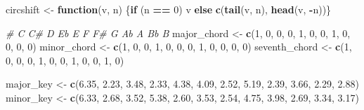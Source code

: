 \documentclass[]{article}
\newenvironment{Shaded}{\begin{snugshade}}{\end{snugshade}}
\newcommand{\CommentTok}[1]{\textcolor[rgb]{0.56,0.35,0.01}{\textit{#1}}}
\newcommand{\ControlFlowTok}[1]{\textcolor[rgb]{0.13,0.29,0.53}{\textbf{#1}}}
\newcommand{\DecValTok}[1]{\textcolor[rgb]{0.00,0.00,0.81}{#1}}
\newcommand{\FloatTok}[1]{\textcolor[rgb]{0.00,0.00,0.81}{#1}}
\newcommand{\KeywordTok}[1]{\textcolor[rgb]{0.13,0.29,0.53}{\textbf{#1}}}
\newcommand{\NormalTok}[1]{#1}
\newcommand{\OperatorTok}[1]{\textcolor[rgb]{0.81,0.36,0.00}{\textbf{#1}}}
\newcommand{\StringTok}[1]{\textcolor[rgb]{0.31,0.60,0.02}{#1}}
\begin{document}
\begin{Shaded}
\begin{Highlighting}[]
\NormalTok{circshift <-}\StringTok{ }\ControlFlowTok{function}\NormalTok{(v, n) \{}\ControlFlowTok{if}\NormalTok{ (n }\OperatorTok{==}\StringTok{ }\DecValTok{0}\NormalTok{) v }\ControlFlowTok{else} \KeywordTok{c}\NormalTok{(}\KeywordTok{tail}\NormalTok{(v, n), }\KeywordTok{head}\NormalTok{(v, }\OperatorTok{-}\NormalTok{n))\}}
                                    
    \CommentTok{# C     C#    D     Eb    E     F     F#    G     Ab    A     Bb    B }
\NormalTok{major_chord <-}\StringTok{ }
\StringTok{    }\KeywordTok{c}\NormalTok{(}\DecValTok{1}\NormalTok{,    }\DecValTok{0}\NormalTok{,    }\DecValTok{0}\NormalTok{,    }\DecValTok{0}\NormalTok{,    }\DecValTok{1}\NormalTok{,    }\DecValTok{0}\NormalTok{,    }\DecValTok{0}\NormalTok{,    }\DecValTok{1}\NormalTok{,    }\DecValTok{0}\NormalTok{,    }\DecValTok{0}\NormalTok{,    }\DecValTok{0}\NormalTok{,    }\DecValTok{0}\NormalTok{)}
\NormalTok{minor_chord <-}\StringTok{ }
\StringTok{    }\KeywordTok{c}\NormalTok{(}\DecValTok{1}\NormalTok{,    }\DecValTok{0}\NormalTok{,    }\DecValTok{0}\NormalTok{,    }\DecValTok{1}\NormalTok{,    }\DecValTok{0}\NormalTok{,    }\DecValTok{0}\NormalTok{,    }\DecValTok{0}\NormalTok{,    }\DecValTok{1}\NormalTok{,    }\DecValTok{0}\NormalTok{,    }\DecValTok{0}\NormalTok{,    }\DecValTok{0}\NormalTok{,    }\DecValTok{0}\NormalTok{)}
\NormalTok{seventh_chord <-}\StringTok{ }
\StringTok{    }\KeywordTok{c}\NormalTok{(}\DecValTok{1}\NormalTok{,    }\DecValTok{0}\NormalTok{,    }\DecValTok{0}\NormalTok{,    }\DecValTok{0}\NormalTok{,    }\DecValTok{1}\NormalTok{,    }\DecValTok{0}\NormalTok{,    }\DecValTok{0}\NormalTok{,    }\DecValTok{1}\NormalTok{,    }\DecValTok{0}\NormalTok{,    }\DecValTok{0}\NormalTok{,    }\DecValTok{1}\NormalTok{,    }\DecValTok{0}\NormalTok{)}

\NormalTok{major_key <-}\StringTok{ }
\StringTok{    }\KeywordTok{c}\NormalTok{(}\FloatTok{6.35}\NormalTok{, }\FloatTok{2.23}\NormalTok{, }\FloatTok{3.48}\NormalTok{, }\FloatTok{2.33}\NormalTok{, }\FloatTok{4.38}\NormalTok{, }\FloatTok{4.09}\NormalTok{, }\FloatTok{2.52}\NormalTok{, }\FloatTok{5.19}\NormalTok{, }\FloatTok{2.39}\NormalTok{, }\FloatTok{3.66}\NormalTok{, }\FloatTok{2.29}\NormalTok{, }\FloatTok{2.88}\NormalTok{)}
\NormalTok{minor_key <-}
\StringTok{    }\KeywordTok{c}\NormalTok{(}\FloatTok{6.33}\NormalTok{, }\FloatTok{2.68}\NormalTok{, }\FloatTok{3.52}\NormalTok{, }\FloatTok{5.38}\NormalTok{, }\FloatTok{2.60}\NormalTok{, }\FloatTok{3.53}\NormalTok{, }\FloatTok{2.54}\NormalTok{, }\FloatTok{4.75}\NormalTok{, }\FloatTok{3.98}\NormalTok{, }\FloatTok{2.69}\NormalTok{, }\FloatTok{3.34}\NormalTok{, }\FloatTok{3.17}\NormalTok{)}


\end{Highlighting}
\end{Shaded}
\end{document}
